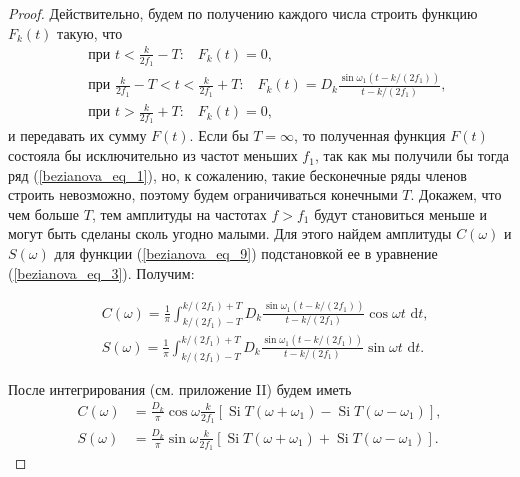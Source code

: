 \begin{proof}
Действительно, будем по получению каждого числа строить функцию $F_k(t)$ такую, что
\begin{equation}\label{bezianova_eq_9}
\begin{aligned}
& \text { при } t<\frac{k}{2 f_1}-T \text{:} \quad F_k(t)=0, \\
& \text { при } \frac{k}{2 f_1}-T<t<\frac{k}{2 f_1}+T \text{:} 
\quad F_k(t)=D_k \frac{\sin \omega_1\left(t-k /\left(2 f_1\right)\right)}{t-k /\left(2 f_1\right)}, \\
& \text { при } t>\frac{k}{2 f_1}+T \text{:} \quad F_k(t)=0,
\end{aligned}
\end{equation}
и передавать их сумму $F(t)$. Если бы $T=\infty$, то полученная функция $F(t)$ состояла бы исключительно из частот меньших $f_1$, так как мы получили бы тогда ряд (\ref{bezianova_eq_1}), но, к сожалению, такие бесконечные ряды членов строить невозможно, поэтому будем ограничиваться конечными $T$. Докажем, что чем больше $T$, тем амплитуды на частотах $f>f_1$ будут становиться меньше и могут быть сделаны сколь угодно малыми. Для этого найдем амплитуды $C(\omega)$ и $S(\omega)$ для функции (\ref{bezianova_eq_9}) подстановкой ее в уравнение (\ref{bezianova_eq_3}). Получим:

\begin{equation}\label{bezianova_eq_10}
\begin{aligned}
& C(\omega)=\frac{1}{\pi} \int_{k /\left(2 f_1\right)-T}^{k /\left(2 f_1\right)+T} D_k \frac{\sin \omega_1\left(t-k /\left(2 f_1\right)\right)}{t-k /\left(2 f_1\right)} \cos \omega t \text{ d} t, \\
& S(\omega)=\frac{1}{\pi} \int_{k /\left(2 f_1\right)-T}^{k /\left(2 f_1\right)+T} D_k \frac{\sin \omega_1\left(t-k /\left(2 f_1\right)\right)}{t-k /\left(2 f_1\right)} \sin \omega t \text{ d} t .
\end{aligned}
\end{equation}

После интегрирования (см. приложение II) будем иметь
\begin{equation}\label{bezianova_eq_11}
\begin{aligned}
C(\omega) & =\frac{D_k}{\pi} \cos \omega \frac{k}{2 f_1}\left[\operatorname{Si} T\left(\omega+\omega_1\right)-\operatorname{Si} T\left(\omega-\omega_1\right)\right], \\
S(\omega) & =\frac{D_k}{\pi} \sin \omega \frac{k}{2 f_1}\left[\operatorname{Si} T\left(\omega+\omega_1\right)+\operatorname{Si} T\left(\omega-\omega_1\right)\right] .
\end{aligned}
\end{equation}


\end{proof}
